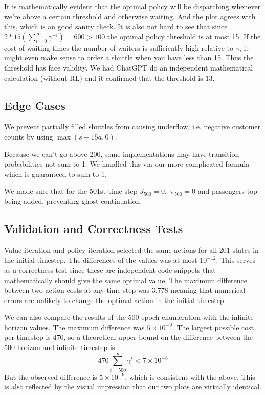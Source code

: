 \documentclass{article}
\begin{document}
It is mathematically evident that the optimal policy will be dispatching whenever we're above a certain threshold and otherwise waiting. And the plot agrees with this, which is an good sanity check. It is also not hard to see that since $2*15(\sum^\infty_{i=0}  \gamma^{-i}) = 600 > 100$ the optimal policy threshold is at most 15. If the cost of waiting times the number of waiters is sufficiently high relative to $\gamma$, it might even make sense to order a shuttle when you have less than 15. Thus the threshold has face validity. We had ChatGPT do an independent mathematical calculation (without RL) and it confirmed that the threshold is 13.

\subsection{Edge Cases}
We prevent partially filled shuttles from causing underflow, i.e. negative customer counts by using $\max(s-15a,0)$.

Because we can't go above 200, some implementations may have transition probabilities not sum to 1. We handled this via our more complicated formula which is guaranteed to sum to 1. 

We made sure that for the 501st time step $J_{500}=0,$ $\pi_{500}=0$  and passengers top being added, preventing ghost continuation. 

\subsection{Validation and Correctness Tests}
Value iteration and policy iteration selected the same actions for all 201 states in the initial timestep. The differences of the values was at most $10^{-12}$. This serves as a correctness test since these are independent code snippets that mathematically should give the same optimal value. The maximum difference between two action costs at any time step was 3.778 meaning that numerical errors are unlikely to change the optimal action in the initial timestep.

We can also compare the results of the 500 epoch enumeration with the infinite horizon values. The maximum difference was $5 \times 10^{-9}$. The largest possible cost per timestep is 470, so a theoretical upper bound on the difference between the 500 horizon and infinite timestep is
\[ 470 \sum_{t=500}^\infty \gamma^{t} < 7 \times 10^{-8}\]
But the observed difference is $5\times 10^{-9}$, which is consistent with the above. This is also reflected by the visual impression that our two plots are virtually identical.
\end{document}
